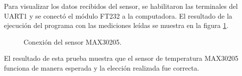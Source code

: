 Para visualizar los datos recibidos del sensor, se habilitaron las terminales del UART1 y se conectó el módulo FT232 a la computadora. El resultado de la ejecución del programa con las mediciones leídas se muestra en la figura \ref{fig:ResultadoTerminalMAX30205}.\\


\begin{figure}[htbp!]
	\centering
	\caption{Conexión del sensor MAX30205.}
	\label{fig:ResultadoTerminalMAX30205}
\end{figure}

El resultado de esta prueba muestra que el sensor de temperatura MAX30205 funciona de manera esperada y la elección realizada fue correcta.

\clearpage